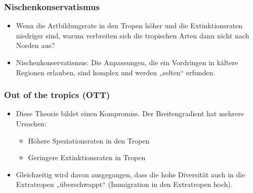 \subsubsection{Nischenkonservatismus}
\begin{itemize}
	\item Wenn die Artbildungsrate in den Tropen höher und die Extinktionsraten niedriger sind, warum verbreiten sich die tropischen Arten dann nicht nach Norden aus?
	\item Nischenkonservatismus: Die Anpassungen, die ein Vordringen in kältere Regionen erlauben, sind komplex und werden „selten“ erfunden.
\end{itemize}

\subsubsection{Out of the tropics (OTT)}
\begin{itemize}
	\item Diese Theorie bildet einen Kompromiss. Der Breitengradient hat mehrere Ursachen:
	\begin{itemize}
		\item Höhere Speziationsraten in den Tropen
		\item Geringere Extinktionsraten in Tropen
	\end{itemize}
	\item Gleichzeitig wird davon ausgegangen, dass die hohe Diversität auch in die Extratropen „überschwappt“ (Immigration in den Extratropen hoch).
\end{itemize}

